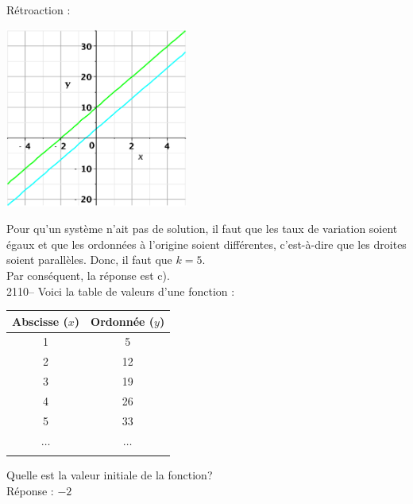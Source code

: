 \documentclass[letterpaper, 12pt]{article}
\begin{document}
R\'etroaction :\\
\begin{center}
 \includegraphics[width=6cm,bb=20 118 575 673]{Q2109.eps}
\end{center}
Pour qu'un syst\`eme n'ait pas de solution, il faut que les taux de variation soient \'egaux et que les ordonn\'ees \`a l'origine soient diff\'erentes, c'est-\`a-dire que les droites soient parall\`eles. Donc, il faut que $k = 5$.\\
Par cons\'equent, la r\'eponse est c).\\


2110--  Voici la table de valeurs d'une fonction : \\
\begin{center}
 \begin{tabular}{|c|c|} \hline
{\bf Abscisse ($x$)} & {\bf Ordonn\'ee ($y$)}  \\ \hline \hline
1 & 5 \\ \hline
2 & 12 \\ \hline
3 & 19 \\ \hline
4 & 26 \\ \hline
5 & 33 \\ \hline
$\ldots$ & $\ldots$ \\ \hline
\multicolumn{2}{c}{}\\
\end{tabular}
\end{center}
Quelle est la valeur initiale de la fonction?\\

R\'eponse : $-2$\\
\end{document}
